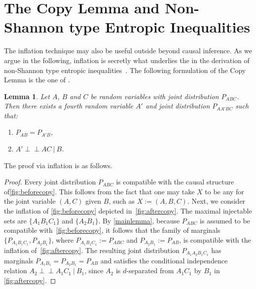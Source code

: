 \documentclass[aps,english,10pt,superscriptaddress,onecolumn,twoside,longbibliography,pra,floatfix,fleqn,nofootinbib]{revtex4-1}
\newcommand*{\tblue}[1]{{\color{medblue}{\textbf{#1}}}}
\newtheorem{lemma}[theorem]{Lemma}
\theoremstyle{definition}
\newcommand{\indep}{\perp\!\!\!\!\perp}
\begin{document}
\section{The Copy Lemma and Non-Shannon type Entropic Inequalities}\label{sec:NonShannon}

The inflation technique may also be useful outside beyond causal inference. As we argue in the following, inflation is secretly what underlies the \tblue{Copy Lemma} in the derivation of non-Shannon type entropic inequalities~\cite[Chapter~15]{yeung_network_2008}. The following formulation of the Copy Lemma is the one of \citet{kaced_equivalence_2013}.

\begin{lemma}
	Let $A$, $B$ and $C$ be random variables with joint distribution $P_{ABC}$. Then there exists a fourth random variable $A'$ and joint distribution $P_{AA'BC}$ such that:
	\begin{enumerate}
		\item $P_{AB} = P_{A'B}$,
		\item $A' \indep AC \:|\: B$.
	\label{copylemma}
	\end{enumerate}
\end{lemma}

The proof via inflation is as follows.

\begin{proof}
Every joint distribution $P_{ABC}$ is compatible with the causal structure of\cref{fig:beforecopy}.  This follows from the fact that one may take $X$ to be any \tblue{sufficient statistic} for the joint variable $(A,C)$ given $B$, such as $X := (A,B,C)$.  Next, we consider the inflation of \cref{fig:beforecopy} depicted in~\cref{fig:aftercopy}. The maximal injectable sets are $\{ A_1 B_1 C_1\}$ and $\{A_2 B_1\}$.  By \cref{mainlemma}, because $P_{ABC}$ is assumed to be compatible with~\cref{fig:beforecopy}, it follows that the family of marginals $\{ P_{A_1 B_1 C_1}, P_{A_2 B_1}\}$, where $P_{A_1 B_1 C_1}:= P_{A B C}$ and $P_{A_2 B_1} := P_{AB}$, is compatible with the inflation of~\cref{fig:aftercopy}. The resulting joint distribution $P_{A_1 A_2 B_1 C_1}$ has marginals $P_{A_1 B_1}= P_{A_2 B_1} =P_{AB}$ and satisfies the conditional independence relation $A_2 \indep A_1 C_1 \:|\: B_1$, since $A_2$ is $d$-separated from $A_1 C_1$ by $B_1$ in \cref{fig:aftercopy}.
\end{proof}
\end{document}
